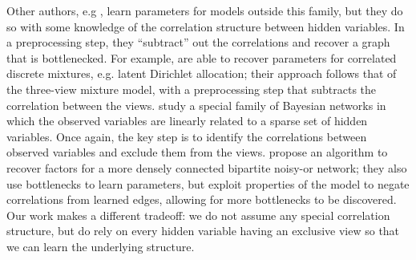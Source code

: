 
Other authors, e.g \citet{anandkumar12lda, anandkumar2013linear,
  halpern13noisyor}, learn parameters for models outside this
  family, but they do so with some knowledge of the correlation structure
  between hidden variables. 
In a preprocessing step, they ``subtract'' out the correlations and
  recover a graph that is bottlenecked.
%
For example,
\citet{anandkumar12lda} are able to recover parameters for correlated
  discrete mixtures, e.g. latent Dirichlet allocation; their approach
  follows that of the three-view mixture model, with a preprocessing step
  that subtracts the correlation between the views.
\citet{anandkumar2013linear} study a special family of Bayesian networks
  in which the observed variables are linearly related to a sparse set of
  hidden variables. Once again, the key step is to identify the
  correlations between observed variables and exclude them from the views.
\citet{halpern13noisyor} propose an algorithm to recover factors for
  a more densely connected bipartite noisy-or network; they also use
  bottlenecks to learn parameters, but exploit properties of the model
  to negate correlations from learned edges, allowing for more
  bottlenecks to be discovered. 
Our work makes a different tradeoff: we do not assume any special correlation structure,
but do rely on every hidden variable having an exclusive view so that we can
learn the underlying structure.



